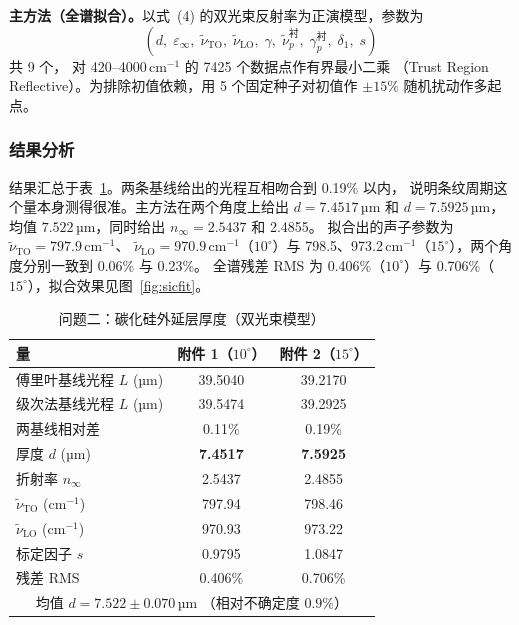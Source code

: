 \documentclass[12pt]{article}
\begin{document}
\textbf{主方法（全谱拟合）。}\;以式~(4) 的双光束反射率为正演模型，参数为
\[(d,\;\varepsilon_\infty,\;\tilde\nu_{\mathrm{TO}},\;\tilde\nu_{\mathrm{LO}},\;\gamma,\;
\tilde\nu_p^{\text{衬}},\;\gamma_p^{\text{衬}},\;\delta_1,\;s)\]
共 9 个，
对 420--4000\,cm$^{-1}$ 的 7425 个数据点作有界最小二乘
（Trust Region Reflective）。为排除初值依赖，用 5 个固定种子对初值作 $\pm15\%$ 随机扰动作多起点。

\subsubsection{结果分析}

结果汇总于表~\ref{tab:sic}。两条基线给出的光程互相吻合到
0.19\% 以内，
说明条纹周期这个量本身测得很准。主方法在两个角度上给出
$d=7.4517$\,µm 和 $d=7.5925$\,µm，
均值 $\mathbf{7.522}$\,µm，同时给出
$n_\infty=2.5437$ 和 2.4855。
拟合出的声子参数为 $\tilde\nu_{\mathrm{TO}}=797.9$\,cm$^{-1}$、
$\tilde\nu_{\mathrm{LO}}=970.9$\,cm$^{-1}$（$10^\circ$）与
798.5、973.2\,cm$^{-1}$（$15^\circ$），两个角度分别一致到
0.06\% 与 0.23\%。
全谱残差 RMS 为 0.406\%（$10^\circ$）与
0.706\%（$15^\circ$），拟合效果见图~\ref{fig:sicfit}。

\begin{table}[!htbp]
  \centering
  \caption{问题二：碳化硅外延层厚度（双光束模型）}\label{tab:sic}
  \begin{tabular}{lcc}
    \toprule
    量 & 附件 1（$10^\circ$） & 附件 2（$15^\circ$） \\
    \midrule
    傅里叶基线光程 $L$ (µm) & 39.5040 & 39.2170 \\
    级次法基线光程 $L$ (µm) & 39.5474 & 39.2925 \\
    两基线相对差 & 0.11\% & 0.19\% \\
    \midrule
    厚度 $d$ (µm) & \textbf{7.4517} & \textbf{7.5925} \\
    折射率 $n_\infty$ & 2.5437 & 2.4855 \\
    $\tilde\nu_{\mathrm{TO}}$ (cm$^{-1}$) & 797.94 & 798.46 \\
    $\tilde\nu_{\mathrm{LO}}$ (cm$^{-1}$) & 970.93 & 973.22 \\
    标定因子 $s$ & 0.9795 & 1.0847 \\
    残差 RMS & 0.406\% & 0.706\% \\
    \midrule
    \multicolumn{3}{c}{均值 $d=7.522\pm0.070$\,µm\quad
      （相对不确定度 0.9\%）} \\
    \bottomrule
  \end{tabular}
\end{table}
\end{document}
